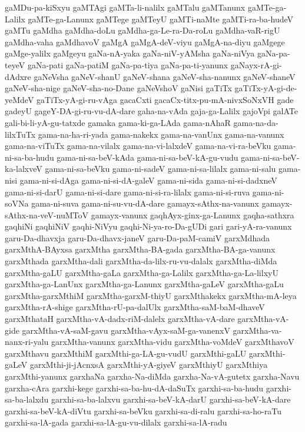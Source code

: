 {gaMDu-pa-kiSxyu
gaMTAgi
gaMTa-li-nalilx
gaMTalu
gaMTanunx
gaMTe-ga-Lalilx
gaMTe-ga-Lanunx
gaMTege
gaMTeyU
gaMTi-naMte
gaMTi-ra-ba-hudeV
gaMTu
gaMdha
gaMdha-doLu
gaMdha-ga-Le-ra-Da-roLu
gaMdha-vaR-rigU
gaMdha-vaha
gaMdhavoV
gaMgA
gaMgA-deV-viyu
gaMgA-na-diyu
gaMgege
gaMge-yalilx
gaMgeyu
gaNa-nA-yaka
gaNa-niV-yAMsha
gaNa-niVya
gaNa-pa-teyeV
gaNa-pati
gaNa-patiM
gaNa-pa-tiya
gaNa-pa-ti-yanunx
gaNayx-rA-gi-dAdxre
gaNeVsha
gaNeV-shanU
gaNeV-shana
gaNeV-sha-nanunx
gaNeV-shaneV
gaNeV-sha-nige
gaNeV-sha-no-Dane
gaNeVshoV
gaNisi
gaTiTx
gaTiTx-yA-gi-de-yeMdeV
gaTiTx-yA-gi-ru-vAga
gacaCxti
gacaCx-titx-pu-mA-nivxSoNxVH
gade
gadeyU
gageY-DA-gi-ru-vu-dA-dare
gaha-na-vAda
gaja-ga-Lalilx
gajoVpi
galATe
gali-bi-li-yA-gu-tatxde
gamaka
gama-ki-ga-LAda
gama-nAhaR
gama-na-da-lilxTuTx
gama-na-ha-ri-yada
gama-nakekx
gama-na-vanUnx
gama-na-vanunx
gama-na-viTuTx
gama-na-vilalx
gama-na-vi-lalxdeV
gama-na-vi-ra-beVku
gama-ni-sa-ba-hudu
gama-ni-sa-beV-kAda
gama-ni-sa-beV-kA-gu-vudu
gama-ni-sa-beV-ka-lalxveV
gama-ni-sa-beVku
gama-ni-sadeV
gama-ni-sa-lilalx
gama-ni-salu
gama-nisi
gama-ni-si-dAga
gama-ni-si-dA-galeV
gama-ni-sida
gama-ni-si-dadxneV
gama-ni-si-darU
gama-ni-si-dare
gama-ni-si-ra-lilalx
gama-ni-si-ruva
gama-ni-soVNa
gama-ni-suva
gama-ni-su-vu-dA-dare
gamayx-sAthx-na-vanunx
gamayx-sAthx-na-veV-nuMToV
gamayx-vanunx
gaqhAyx-ginx-ga-Lanunx
gaqha-sathxra
gaqhiNi
gaqhiNiV
gaqhi-NiVyu
gaqhi-Ni-ya-ro-Da-gUDi
gari
gari-yA-ra-vanunx
garu-Da-dhavxja
garu-Da-dhavx-janeV
garu-Da-paM-camiV
garxMdhada
garxMthA-BAyxsa
garxMtha
garxMtha-BA-gada
garxMtha-BA-ga-vanunx
garxMthada
garxMtha-dali
garxMtha-da-lilx-ru-vu-dalalx
garxMtha-diMda
garxMtha-gaLU
garxMtha-gaLa
garxMtha-ga-Lalilx
garxMtha-ga-La-lilxyU
garxMtha-ga-LanUnx
garxMtha-ga-Lanunx
garxMtha-gaLeV
garxMtha-gaLu
garxMtha-garxMthiM
garxMtha-garxM-thiyU
garxMthakekx
garxMtha-mA-leya
garxMtha-rA-shige
garxMtha-rU-pa-dalUlx
garxMtha-saM-baM-dhaveV
garxMthataH
garxMtha-vA-dadx-riM-dalelx
garxMtha-vA-dare
garxMtha-vA-gide
garxMtha-vA-saM-gavu
garxMtha-vAyx-saM-ga-vanenxV
garxMtha-va-nanx-ri-yalu
garxMtha-vanunx
garxMtha-vidu
garxMtha-voMdeV
garxMthavoV
garxMthavu
garxMthiM
garxMthi-ga-LA-gu-vudU
garxMthi-gaLU
garxMthi-gaLeV
garxMthi-ji-jAcnxsA
garxMthi-yA-giyeV
garxMthiyU
garxMthiya
garxMthi-yanunx
garxhaNa
garxha-Na-diMda
garxha-Na-vA-gutetx
garxha-Navu
garxha-cAra
garxhi-kege
garxhi-sa-ba-hu-dA-daSuTx
garxhi-sa-ba-hudu
garxhi-sa-ba-lalxdu
garxhi-sa-ba-lalxvu
garxhi-sa-beV-kA-darU
garxhi-sa-beV-kA-dare
garxhi-sa-beV-kA-diVtu
garxhi-sa-beVku
garxhi-sa-di-ralu
garxhi-sa-ho-raTu
garxhi-sa-lA-gada
garxhi-sa-lA-gu-vu-dilalx
garxhi-sa-lA-radu
}

